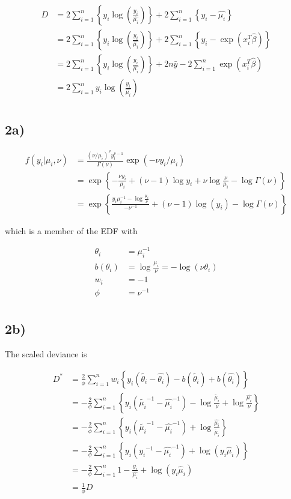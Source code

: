 \documentclass[12pt,]{article}
\newcommand{\p}[1]{\left(#1\right)}
\newcommand{\bc}[1]{ \left\{#1\right\} }
\newcommand{\suml}{ \sum_{i=1}^n }
\newcommand{\ds}{ \displaystyle }
\begin{document}
\begin{align*}
D &= 2\suml \bc{y_i\log\p{\frac{y_i}{\hat{\mu_i}}}} + 2\suml\bc{y_i - \hat{\mu_i}}\\
  &= 2\suml \bc{y_i\log\p{\frac{y_i}{\hat{\mu_i}}}} + 2\suml\bc{y_i - \exp(x_i^T\hat\beta)}\\
  &= 2\suml \bc{y_i\log\p{\frac{y_i}{\hat{\mu_i}}}} + 2n\bar{y} - 2\suml\exp(x_i^T\hat\beta)\\
  &= 2\suml y_i\log\p{\frac{y_i}{\hat{\mu_i}}} \\
\end{align*}

\subsection{2a)}\label{a-1}

\begin{align*}
f(y_i|\mu_i,\nu) &= \ds\frac{(\nu/\mu_i)^\nu y_i^{\nu-1}}{\Gamma(\nu)}\exp(-\nu y_i/\mu_i)\\
&= \exp\bc{-\frac{\nu y_i}{\mu_i} + (\nu-1)\log y_i + \nu\log\frac{\nu}{\mu_i}-\log\Gamma(\nu)}\\
&= \exp\bc{\ds\frac{y_i \mu_i^{-1} - \log\ds\frac{\mu_i}{\nu}}{-\nu^{-1}} + (\nu-1)\log(y_i) - \log\Gamma(\nu)}
\end{align*}

which is a member of the EDF with

\begin{align*}
\theta_i &= \mu_i^{-1} \\
b(\theta_i) &= \log\frac{\mu_i}{\nu} = -\log(\nu\theta_i)\\
w_i &= -1 \\
\phi &= \nu^{-1} \\
\end{align*}

\newpage

\subsection{2b)}\label{b-1}

The scaled deviance is

\begin{align*}
D^* &= \frac{2}{\phi}\suml w_i\bc{y_i\p{\tilde{\theta_i}-\hat{\theta_i}} - b(\tilde{\theta_i}) + b(\hat{\theta_i})} \\
    &= -\frac{2}{\phi}\suml \bc{y_i\p{\tilde{\mu_i}^{-1}-\hat{\mu_i}^{-1}} - \log\frac{\tilde{\mu_i}}{\nu} + \log\frac{\hat{\mu_i}}{\nu}} \\
    &= -\frac{2}{\phi}\suml \bc{y_i\p{\tilde{\mu_i}^{-1}-\hat{\mu_i}^{-1}} + \log\frac{\hat{\mu_i}}{\tilde{\mu_i}} }\\
    &= -\frac{2}{\phi}\suml \bc{y_i\p{{y_i}^{-1}-\hat{\mu_i}^{-1}} + \log(y_i\hat\mu_i) }\\
    &= -\frac{2}{\phi}\suml 1-\frac{y_i}{\hat{\mu_i}} + \log(y_i\hat\mu_i)\\
    &= \frac{1}{\phi} D
\end{align*}
\end{document}
